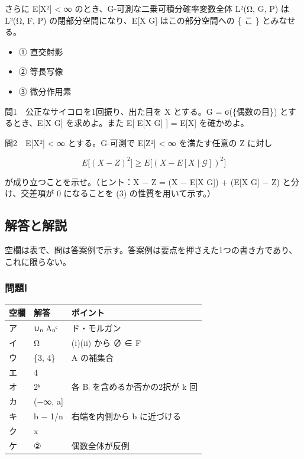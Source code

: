 \documentclass[
  10pt,
  a4paper,
]{article}
\providecommand{\tightlist}{%
  \setlength{\itemsep}{0pt}\setlength{\parskip}{0pt}}
\begin{document}
さらに E{[}X²{]} \textless{} ∞ のとき、G-可測な二乗可積分確率変数全体
L²(Ω, G, P) は L²(Ω, F, P) の閉部分空間になり、E{[}X \textbar{} G{]}
はこの部分空間への \{ こ \} とみなせる。

\begin{itemize}
\tightlist
\item
  ① 直交射影
\item
  ② 等長写像
\item
  ③ 微分作用素
\end{itemize}

問1　公正なサイコロを1回振り、出た目を X とする。G = σ(\{偶数の目\})
とするとき、E{[}X \textbar{} G{]} を求めよ。また E{[} E{[}X \textbar{}
G{]} {]} = E{[}X{]} を確かめよ。

問2　E{[}X²{]} \textless{} ∞ とする。G-可測で E{[}Z²{]} \textless{} ∞
を満たす任意の Z に対し

\[E\big[(X - Z)^2\big] \ge E\big[(X - E[X \mid \mathcal{G}])^2\big]\]

が成り立つことを示せ。（ヒント：X − Z = (X − E{[}X \textbar{} G{]}) +
(E{[}X \textbar{} G{]} − Z) と分け、交差項が 0 になることを (3)
の性質を用いて示す。）

\hypertarget{ux89e3ux7b54ux3068ux89e3ux8aac}{%
\subsection{解答と解説}\label{ux89e3ux7b54ux3068ux89e3ux8aac}}

空欄は表で、問は答案例で示す。答案例は要点を押さえた1つの書き方であり、これに限らない。

\hypertarget{ux554fux984cux2170}{%
\subsubsection{問題Ⅰ}\label{ux554fux984cux2170}}

\begin{longtable}[]{@{}lll@{}}
\toprule\noalign{}
空欄 & 解答 & ポイント \\
\midrule\noalign{}
\endhead
\bottomrule\noalign{}
\endlastfoot
ア & ∪{\fallbackfont ₙ} A{\fallbackfont ₙᶜ} & ド・モルガン \\
イ & Ω & (i)(ii) から ∅ ∈ F \\
ウ & \{3, 4\} & A の補集合 \\
エ & 4 & \\
オ & 2{\fallbackfont ᵏ} & 各 B{\fallbackfont ᵢ} を含めるか否かの2択が k
回 \\
カ & (−∞, a{]} & \\
キ & b − 1/n & 右端を内側から b に近づける \\
ク & x & \\
ケ & ② & 偶数全体が反例 \\
\end{longtable}
\end{document}
